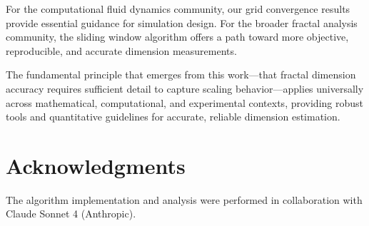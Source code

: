 \documentclass[preprint,12pt]{elsarticle}
\begin{document}
For the computational fluid dynamics community, our grid convergence results provide essential guidance for simulation design. For the broader fractal analysis community, the sliding window algorithm offers a path toward more objective, reproducible, and accurate dimension measurements.

The fundamental principle that emerges from this work—that fractal dimension accuracy requires sufficient detail to capture scaling behavior—applies universally across mathematical, computational, and experimental contexts, providing robust tools and quantitative guidelines for accurate, reliable dimension estimation.

\section*{Acknowledgments}
The algorithm implementation and analysis were performed in collaboration with Claude Sonnet 4 (Anthropic).



\end{document}
